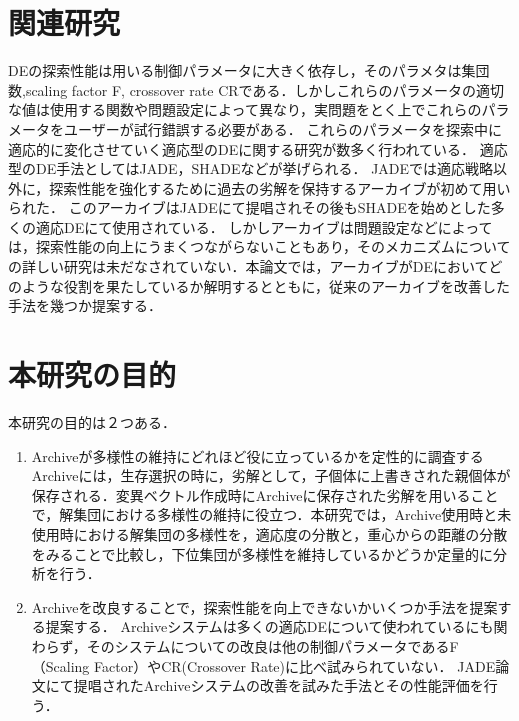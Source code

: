 \documentclass[a4paper,11pt,oneside,openany]{jsbook}
\begin{document}
\section{関連研究}
DEの探索性能は用いる制御パラメータに大きく依存し，そのパラメタは集団数,scaling factor F, crossover rate CRである．しかしこれらのパラメータの適切な値は使用する関数や問題設定によって異なり，実問題をとく上でこれらのパラメータをユーザーが試行錯誤する必要がある．
これらのパラメータを探索中に適応的に変化させていく適応型のDEに関する研究が数多く行われている．
適応型のDE手法としてはJADE\cite{JADE}，SHADE\cite{SHADE}などが挙げられる．
JADEでは適応戦略以外に，探索性能を強化するために過去の劣解を保持するアーカイブが初めて用いられた．
このアーカイブはJADEにて提唱されその後もSHADEを始めとした多くの適応DEにて使用されている．
しかしアーカイブは問題設定などによっては，探索性能の向上にうまくつながらないこともあり，そのメカニズムについての詳しい研究は未だなされていない．本論文では，アーカイブがDEにおいてどのような役割を果たしているか解明するとともに，従来のアーカイブを改善した手法を幾つか提案する．

\section{本研究の目的}
本研究の目的は２つある．
\begin{enumerate}
\item Archiveが多様性の維持にどれほど役に立っているかを定性的に調査する
\vspace{3mm}
\newline
Archiveには，生存選択の時に，劣解として，子個体に上書きされた親個体が保存される．変異ベクトル作成時にArchiveに保存された劣解を用いることで，解集団における多様性の維持に役立つ．本研究では，Archive使用時と未使用時における解集団の多様性を，適応度の分散と，重心からの距離の分散をみることで比較し，下位集団が多様性を維持しているかどうか定量的に分析を行う．
\newline


\item Archiveを改良することで，探索性能を向上できないかいくつか手法を提案する提案する．
\vspace{3mm}
\newline
Archiveシステムは多くの適応DEについて使われているにも関わらず，そのシステムについての改良は他の制御パラメータであるF（Scaling Factor）やCR(Crossover Rate)に比べ試みられていない．
JADE論文にて提唱されたArchiveシステムの改善を試みた手法とその性能評価を行う．


\end{enumerate}
\end{document}
